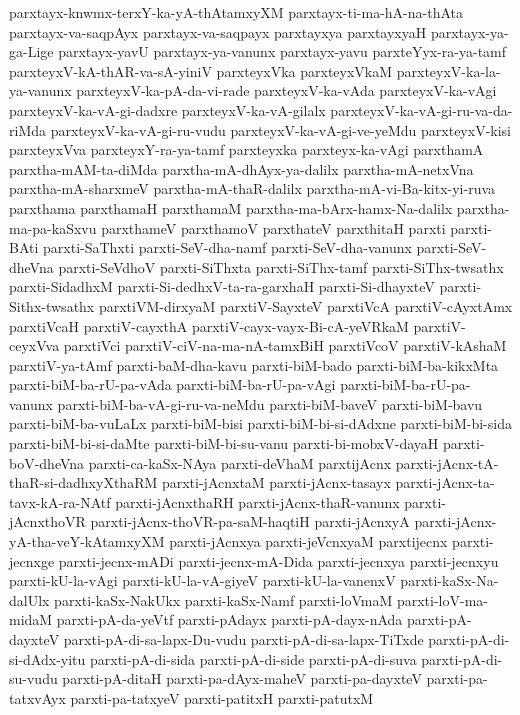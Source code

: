 {parxtayx-knwmx-terxY-ka-yA-thAtamxyXM
parxtayx-ti-ma-hA-na-thAta
parxtayx-va-saqpAyx
parxtayx-va-saqpayx
parxtayxya
parxtayxyaH
parxtayx-ya-ga-Lige
parxtayx-yavU
parxtayx-ya-vanunx
parxtayx-yavu
parxteYyx-ra-ya-tamf
parxteyxV-kA-thAR-va-sA-yiniV
parxteyxVka
parxteyxVkaM
parxteyxV-ka-la-ya-vanunx
parxteyxV-ka-pA-da-vi-rade
parxteyxV-ka-vAda
parxteyxV-ka-vAgi
parxteyxV-ka-vA-gi-dadxre
parxteyxV-ka-vA-gilalx
parxteyxV-ka-vA-gi-ru-va-da-riMda
parxteyxV-ka-vA-gi-ru-vudu
parxteyxV-ka-vA-gi-ve-yeMdu
parxteyxV-kisi
parxteyxVva
parxteyxY-ra-ya-tamf
parxteyxka
parxteyx-ka-vAgi
parxthamA
parxtha-mAM-ta-diMda
parxtha-mA-dhAyx-ya-dalilx
parxtha-mA-netxVna
parxtha-mA-sharxmeV
parxtha-mA-thaR-dalilx
parxtha-mA-vi-Ba-kitx-yi-ruva
parxthama
parxthamaH
parxthamaM
parxtha-ma-bArx-hamx-Na-dalilx
parxtha-ma-pa-kaSxvu
parxthameV
parxthamoV
parxthateV
parxthitaH
parxti
parxti-BAti
parxti-SaThxti
parxti-SeV-dha-namf
parxti-SeV-dha-vanunx
parxti-SeV-dheVna
parxti-SeVdhoV
parxti-SiThxta
parxti-SiThx-tamf
parxti-SiThx-twsathx
parxti-SidadhxM
parxti-Si-dedhxV-ta-ra-garxhaH
parxti-Si-dhayxteV
parxti-Sithx-twsathx
parxtiVM-dirxyaM
parxtiV-SayxteV
parxtiVcA
parxtiV-cAyxtAmx
parxtiVcaH
parxtiV-cayxthA
parxtiV-cayx-vayx-Bi-cA-yeVRkaM
parxtiV-ceyxVva
parxtiVci
parxtiV-ciV-na-ma-nA-tamxBiH
parxtiVcoV
parxtiV-kAshaM
parxtiV-ya-tAmf
parxti-baM-dha-kavu
parxti-biM-bado
parxti-biM-ba-kikxMta
parxti-biM-ba-rU-pa-vAda
parxti-biM-ba-rU-pa-vAgi
parxti-biM-ba-rU-pa-vanunx
parxti-biM-ba-vA-gi-ru-va-neMdu
parxti-biM-baveV
parxti-biM-bavu
parxti-biM-ba-vuLaLx
parxti-biM-bisi
parxti-biM-bi-si-dAdxne
parxti-biM-bi-sida
parxti-biM-bi-si-daMte
parxti-biM-bi-su-vanu
parxti-bi-mobxV-dayaH
parxti-boV-dheVna
parxti-ca-kaSx-NAya
parxti-deVhaM
parxtijAcnx
parxti-jAcnx-tA-thaR-si-dadhxyXthaRM
parxti-jAcnxtaM
parxti-jAcnx-tasayx
parxti-jAcnx-ta-tavx-kA-ra-NAtf
parxti-jAcnxthaRH
parxti-jAcnx-thaR-vanunx
parxti-jAcnxthoVR
parxti-jAcnx-thoVR-pa-saM-haqtiH
parxti-jAcnxyA
parxti-jAcnx-yA-tha-veY-kAtamxyXM
parxti-jAcnxya
parxti-jeVcnxyaM
parxtijecnx
parxti-jecnxge
parxti-jecnx-mADi
parxti-jecnx-mA-Dida
parxti-jecnxya
parxti-jecnxyu
parxti-kU-la-vAgi
parxti-kU-la-vA-giyeV
parxti-kU-la-vanenxV
parxti-kaSx-Na-dalUlx
parxti-kaSx-NakUkx
parxti-kaSx-Namf
parxti-loVmaM
parxti-loV-ma-midaM
parxti-pA-da-yeVtf
parxti-pAdayx
parxti-pA-dayx-nAda
parxti-pA-dayxteV
parxti-pA-di-sa-lapx-Du-vudu
parxti-pA-di-sa-lapx-TiTxde
parxti-pA-di-si-dAdx-yitu
parxti-pA-di-sida
parxti-pA-di-side
parxti-pA-di-suva
parxti-pA-di-su-vudu
parxti-pA-ditaH
parxti-pa-dAyx-maheV
parxti-pa-dayxteV
parxti-pa-tatxvAyx
parxti-pa-tatxyeV
parxti-patitxH
parxti-patutxM
}
